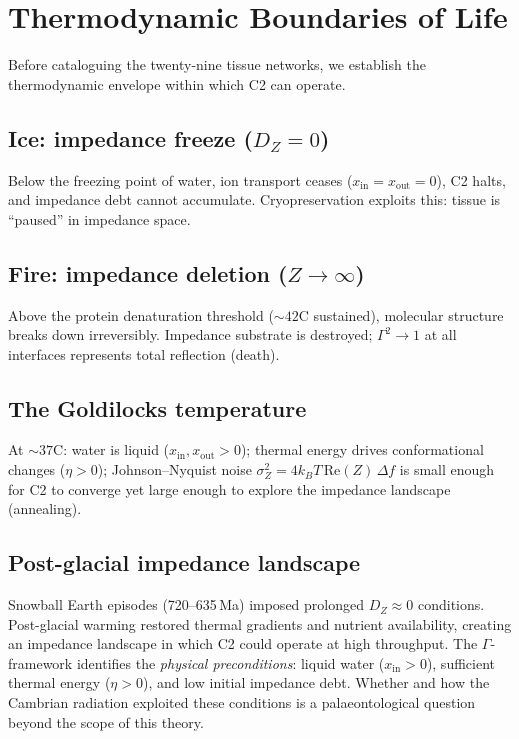 \documentclass[aps,pre,twocolumn,superscriptaddress,floatfix]{revtex4-2}
\begin{document}
\section{Thermodynamic Boundaries of Life}
\label{sec:boundaries}

Before cataloguing the twenty-nine tissue networks,
we establish the thermodynamic envelope within which
C2 can operate.

\subsection{Ice: impedance freeze ($D_Z = 0$)}

Below the freezing point of water, ion transport
ceases ($x_{\text{in}} = x_{\text{out}} = 0$),
C2 halts, and impedance debt cannot accumulate.
Cryopreservation exploits this: tissue is ``paused''
in impedance space.

\subsection{Fire: impedance deletion ($Z \to \infty$)}

Above the protein denaturation threshold
($\sim 42$\textdegree C sustained), molecular structure
breaks down irreversibly.
Impedance substrate is destroyed;
$\Gamma^2 \to 1$ at all interfaces represents total
reflection (death).

\subsection{The Goldilocks temperature}

At $\sim 37$\textdegree C: water is liquid
($x_{\text{in}}, x_{\text{out}} > 0$);
thermal energy drives conformational changes
($\eta > 0$); Johnson--Nyquist noise
$\sigma_Z^2 = 4k_BT\,\text{Re}(Z)\,\Delta f$
is small enough for C2 to converge yet large
enough to explore the impedance landscape (annealing).

\subsection{Post-glacial impedance landscape}

Snowball Earth episodes
(\mbox{720--635\,Ma}) imposed prolonged $D_Z \approx 0$
conditions.  Post-glacial warming restored thermal
gradients and nutrient availability, creating an
impedance landscape in which C2 could operate at high
throughput.
The $\Gamma$-framework identifies the \emph{physical
preconditions}: liquid water ($x_{\text{in}} > 0$),
sufficient thermal energy ($\eta > 0$), and
low initial impedance debt.
Whether and how the Cambrian radiation exploited
these conditions is a palaeontological question
beyond the scope of this theory.
\end{document}
